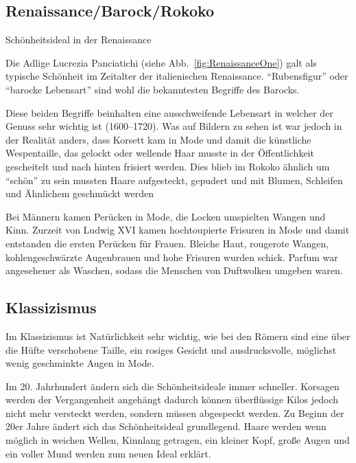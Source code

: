 \subsection{Renaissance/Barock/Rokoko}

\begin{figurewrapper}
	 \hfill
	\caption{Schönheitsideal in der Renaissance}
\end{figurewrapper}

Die Adlige Lucrezia Panciatichi (siehe Abb.~\vref{fig:RenaissanceOne}) galt als typische
Schönheit im Zeitalter der italienischen Renaissance. \enquote{Rubensfigur} oder \enquote{barocke Lebensart} sind
wohl die bekanntesten Begriffe des Barocks.


Diese beiden Begriffe beinhalten eine ausschweifende Lebensart in welcher der Genuss sehr wichtig ist
(1600--1720). Was auf Bildern zu sehen ist war jedoch in der Realität anders, dass Korsett kam in
Mode und damit die künstliche Wespentaille, das gelockt oder wellende Haar musste in der
Öffentlichkeit gescheitelt und nach hinten frisiert werden.
Dies blieb im Rokoko ähnlich um \enquote{schön} zu sein mussten Haare aufgesteckt, gepudert und mit Blumen,
Schleifen und Ähnlichem geschmückt werden

Bei Männern kamen Perücken in Mode, die Locken umspielten Wangen und Kinn.
Zurzeit von Ludwig XVI kamen hochtoupierte Frisuren in Mode und damit entstanden die ersten Perücken
für Frauen. Bleiche Haut, rougerote Wangen, kohlengeschwärzte Augenbrauen und hohe Frisuren wurden
schick. Parfum war angesehener als Waschen, sodass die Menschen
von Duftwolken umgeben waren.

\subsection{Klassizismus}
Im Klassizismus ist Natürlichkeit sehr wichtig, wie bei den Römern sind eine über die Hüfte
verschobene Taille, ein rosiges Gesicht und ausdrucksvolle, möglichst wenig geschminkte Augen in
Mode.

Im 20. Jahrhundert ändern sich die Schönheitsideale immer schneller. Korsagen werden der
Vergangenheit angehängt dadurch können überflüssige Kilos jedoch nicht mehr versteckt werden,
sondern müssen abgespeckt werden. Zu Beginn der 20er Jahre ändert sich das Schönheitsideal
grundlegend. Haare werden wenn möglich in weichen Wellen, Kinnlang getragen, ein kleiner Kopf, große
Augen und ein voller Mund werden zum neuen Ideal erklärt.

